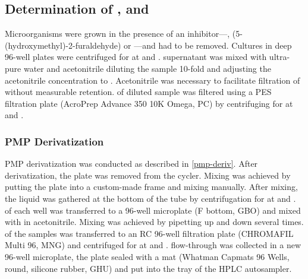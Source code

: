 \subsection{Determination of \FUR{}, \HMF{} and \VAN{}\label{subsec-inh-ald}} %
Microorganisms were grown in the presence of an inhibitor---\fur{}, \hmf{} (5-(hydroxymethyl)-2-furaldehyde) or \van{}---and had to be removed. Cultures in deep 96-well plates were centrifuged for  at  and .  supernatant was mixed with  ultra-pure water and  acetonitrile diluting the sample 10-fold and adjusting the acetonitrile concentration to . Acetonitrile was necessary to facilitate filtration of \fur{} without measurable retention.  of diluted sample was filtered using a  PES filtration plate (AcroPrep Advance 350 10K Omega, PC) by centrifuging for  at  and .

\subsubsection{PMP Derivatization}
PMP derivatization was conducted as described in \vref{pmp-deriv}. After derivatization, the plate was removed from the cycler. Mixing was achieved by putting the plate into a custom-made frame and mixing manually. After mixing, the liquid was gathered at the bottom of the tube by centrifugation for  at  and .  of each well was transferred to a 96-well microplate (F bottom, GBO) and mixed with   \acet{} in  acetonitrile. Mixing was achieved by pipetting up and down several times.  of the samples was transferred to an  RC 96-well filtration plate (CHROMAFIL Multi 96, MNG) and centrifuged for  at  and .  flow-through was collected in a new 96-well microplate, the plate sealed with a mat (Whatman Capmats 96 Wells, round, silicone rubber, GHU) and put into the tray of the HPLC autosampler.%

